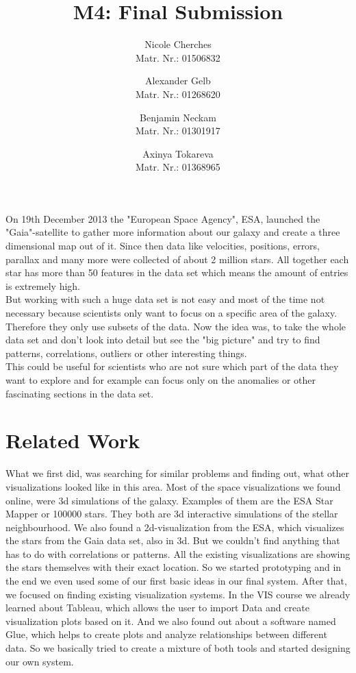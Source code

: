 \documentclass{vgtc}                          %
\title{M4: Final Submission}
\author{Nicole Cherches\\
\scriptsize Matr. Nr.: 01506832
\and Alexander Gelb\\
\scriptsize Matr. Nr.: 01268620
\and Benjamin Neckam\\
\scriptsize Matr. Nr.: 01301917
\and Axinya Tokareva\\
\scriptsize Matr. Nr.: 01368965
}
\begin{document}

\maketitle
On 19th December 2013 the "European Space Agency", ESA, launched  the "Gaia"-satellite to gather more information about our galaxy and create a three dimensional map out of it. Since then data like velocities, positions, errors, parallax and many more were collected of about 2 million stars. All together each star has more than 50 features in the data set which means the amount of entries is extremely high.\\
But working with such a huge data set is not easy and most of the time not necessary because scientists only want to focus on a specific area of the galaxy. Therefore they only use subsets of the data. Now the idea was, to take the whole data set and don't look into detail but see the "big picture" and try to find patterns, correlations, outliers or other interesting things.\\
This could be useful for scientists who are not sure which part of the data they want to explore and for example can focus only on the anomalies or other fascinating sections in the data set.

\section{Related Work}
What we first did, was searching for similar problems and finding out, what other visualizations looked like in this area. Most of the space visualizations we found online, were 3d simulations of the galaxy. Examples of them are the ESA Star Mapper\cite{starmapper} or 100000 stars\cite{chromeexperiment}. They both are 3d interactive simulations of the stellar neighbourhood.
We also found a 2d-visualization from the ESA, which visualizes the stars from the Gaia data set\cite{gavs}, also in 3d.
But we couldn't find anything that has to do with correlations or patterns. All the existing visualizations are showing the stars themselves with their exact location.
So we started prototyping and in the end we even used some of our first basic ideas in our final system.
After that, we focused on finding existing visualization systems. In the VIS course we already learned about Tableau\cite{tableau}, which allows the user to import Data and create visualization plots based on it. And we also found out about a software named Glue\cite{glue}, which helps to create plots and analyze relationships between different data.
So we basically tried to create a mixture of both tools and started designing our own system.
\end{document}
